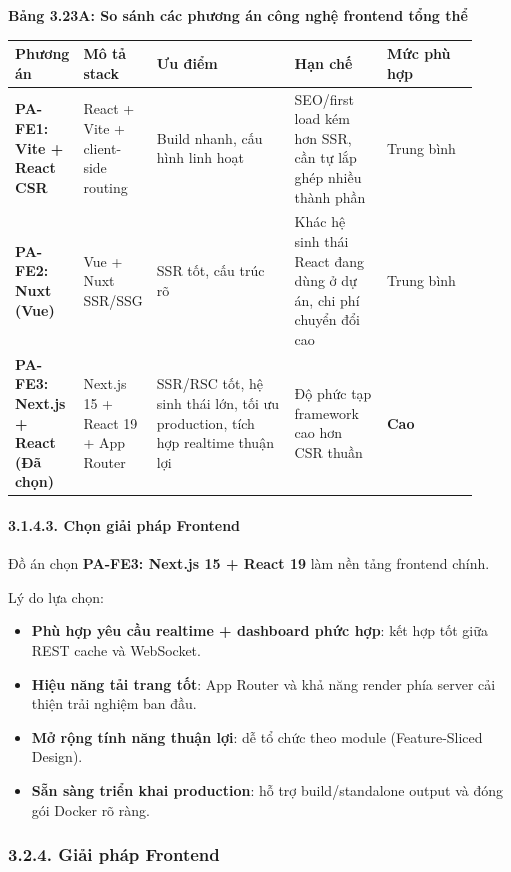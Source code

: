 \documentclass[13pt,a4paper]{extarticle}
\newcounter{none} %
\newcommand{\thesislongtableorignewline}{}
\let\thesislongtableorignewline\\
\renewcommand{\\}{\thesislongtableorignewline\hline}%
\let\\\thesislongtableorignewline
\newcommand{\thesistabletitle}[1]{%
  \begin{center}\textbf{#1}\end{center}%
}
\providecommand{\tightlist}{%
  \setlength{\itemsep}{0pt}\setlength{\parskip}{0pt}}
\begin{document}
\thesistabletitle{Bảng 3.23A: So sánh các phương án công nghệ frontend tổng thể}

{\def\LTcaptype{none} %
\begin{longtable}{|p{0.12\linewidth}|p{0.10\linewidth}|p{0.30\linewidth}|p{0.20\linewidth}|p{0.20\linewidth}|}
\hline \textbf{Phương án} & \textbf{Mô tả stack} & \textbf{Ưu điểm} & \textbf{Hạn chế} & \textbf{Mức phù hợp} \\
\hline
\endhead
\hline
\endlastfoot
\textbf{PA-FE1: Vite + React CSR} & React + Vite + client-side routing &
Build nhanh, cấu hình linh hoạt & SEO/first load kém hơn SSR, cần tự lắp
ghép nhiều thành phần & Trung bình \\
\textbf{PA-FE2: Nuxt (Vue)} & Vue + Nuxt SSR/SSG & SSR tốt, cấu trúc rõ
& Khác hệ sinh thái React đang dùng ở dự án, chi phí chuyển đổi cao &
Trung bình \\
\textbf{PA-FE3: Next.js + React (Đã chọn)} & Next.js 15 + React 19 + App
Router & SSR/RSC tốt, hệ sinh thái lớn, tối ưu production, tích hợp
realtime thuận lợi & Độ phức tạp framework cao hơn CSR thuần &
\textbf{Cao} \\
\end{longtable}
}

\paragraph{3.1.4.3. Chọn giải pháp
Frontend}\label{3143-chux1ecdn-giux1ea3i-phuxe1p-frontend}

Đồ án chọn \textbf{PA-FE3: Next.js 15 + React 19} làm nền tảng frontend
chính.

Lý do lựa chọn:

\begin{itemize}
\tightlist
\item
  \textbf{Phù hợp yêu cầu realtime + dashboard phức hợp}: kết hợp tốt
  giữa REST cache và WebSocket.
\item
  \textbf{Hiệu năng tải trang tốt}: App Router và khả năng render phía
  server cải thiện trải nghiệm ban đầu.
\item
  \textbf{Mở rộng tính năng thuận lợi}: dễ tổ chức theo module
  (Feature-Sliced Design).
\item
  \textbf{Sẵn sàng triển khai production}: hỗ trợ build/standalone
  output và đóng gói Docker rõ ràng.
\end{itemize}

\subsubsection{3.2.4. Giải pháp
Frontend}\label{324-giux1ea3i-phuxe1p-frontend}
\end{document}
